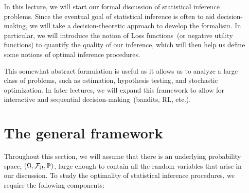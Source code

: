 \documentclass[12pt]{article}
\begin{document}
	\MakeScribeTop

In this lecture, we will start our formal discussion of statistical inference problems. Since the eventual goal of statistical inference is often to aid decision-making, we will take a decision-theoretic approach to develop the formalism. In particular, we will introduce the notion of Loss functions~(or negative utility functions) to quantify the quality of our inference, which will then help us define some notions of optimal inference procedures. 

This somewhat abstract formulation is useful as it allows us to analyze a large class of problems, such as  estimation, hypothesis testing, and stochastic optimization. In later lectures, we will expand this framework to allow for interactive and sequential decision-making~(bandits, RL, etc.). 

\section{The general framework}
\label{sec:decision-theoretic-framework}

Throughout this section, we will assume that there is an underlying probability space, $(\Omega, {\cal F}_\Omega, \mathbb{P})$, large enough to contain all the random variables that arise in our discussion. To study the optimality of statistical inference procedures, we require the following components: 
\end{document}
